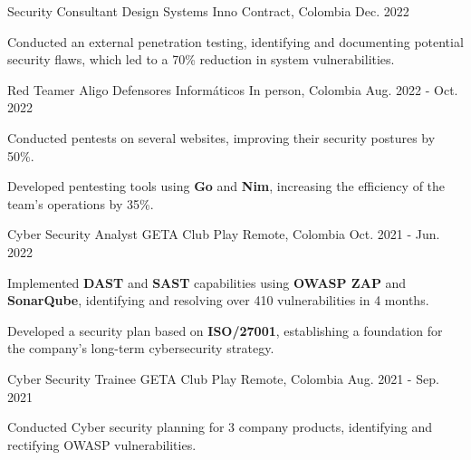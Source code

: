\begin{cventries}
  \cventry
  {Security Consultant} %
  {Design Systems Inno} %
  {Contract, Colombia} %
  {Dec. 2022} %
  {
    \begin{cvitems} %
      \item {Conducted an external penetration testing, identifying and
                  documenting potential security flaws, which led to a 70\% reduction in system vulnerabilities.}
    \end{cvitems}
  }

  \cventry
  {Red Teamer} %
  {Aligo Defensores Informáticos} %
  {In person, Colombia} %
  {Aug. 2022 - Oct. 2022} %
  {
    \begin{cvitems} %
      \item {Conducted pentests on several websites, improving their security postures by 50\%.}
      \item {Developed pentesting tools using \textbf{Go} and \textbf{Nim}, increasing the efficiency of the team's operations by 35\%.}
    \end{cvitems}
  }

  \cventry
  {Cyber Security Analyst} %
  {GETA Club Play} %
  {Remote, Colombia} %
  {Oct. 2021 - Jun. 2022} %
  {
    \begin{cvitems} %
      \item {Implemented \textbf{DAST} and \textbf{SAST} capabilities using \textbf{OWASP ZAP} and \textbf{SonarQube}, identifying and resolving over 410 vulnerabilities in 4 months.}
      \item {Developed a security plan based on \textbf{ISO/27001}, establishing a foundation for the company's long-term cybersecurity strategy.}
    \end{cvitems}
  }

  \cventry
  {Cyber Security Trainee} %
  {GETA Club Play} %
  {Remote, Colombia} %
  {Aug. 2021 - Sep. 2021} %
  {
    \begin{cvitems} %
      \item {Conducted Cyber security planning for 3 company products, identifying and rectifying OWASP vulnerabilities.}
    \end{cvitems}
  }


\end{cventries}
